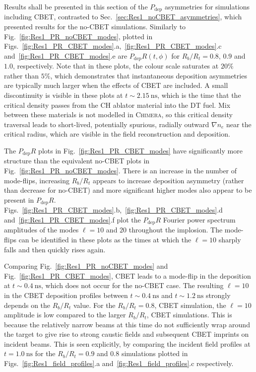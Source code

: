 Results shall be presented in this section of the $P_{\text{dep}}$ asymmetries for simulations including \ac{CBET}, contrasted to Sec.~\ref{sec:Res1_noCBET_asymmetries}, which presented results for the no-\ac{CBET} simulations.
Similarly to Fig.~\ref{fig:Res1_PR_noCBET_modes}, plotted in Figs.~\ref{fig:Res1_PR_CBET_modes}.a,~\ref{fig:Res1_PR_CBET_modes}.c and~\ref{fig:Res1_PR_CBET_modes}.e are $P_{\text{dep}}R(t,\phi)$ for $R_b/R_t=0.8$, $0.9$ and $1.0$, respectively.
Note that in these plots, the colour scale saturates at $20\%$ rather than $5\%$, which demonstrates that instantaneous deposition asymmetries are typically much larger when the effects of \ac{CBET} are included.
A small discontinuity is visible in these plots at $t\sim2.15\ \text{ns}$, which is the time that the critical density passes from the CH ablator material into the DT fuel.
Mix between these materials is not modelled in \textsc{Chimera}, so this critical density traversal leads to short-lived, potentially spurious, radially outward $\nabla n_e$ near the critical radius, which are visible in the field reconstruction and deposition.

The $P_{\text{dep}}R$ plots in Fig.~\ref{fig:Res1_PR_CBET_modes} have significantly more structure than the equivalent no-\ac{CBET} plots in Fig.~\ref{fig:Res1_PR_noCBET_modes}.
There is an increase in the number of mode-flips, increasing $R_b/R_t$ appears to increase deposition asymmetry (rather than decrease for no-\ac{CBET}) and more significant higher modes also appear to be present in $P_{\text{dep}}R$.
Figs.~\ref{fig:Res1_PR_CBET_modes}.b,~\ref{fig:Res1_PR_CBET_modes}.d and~\ref{fig:Res1_PR_CBET_modes}.f plot the $P_{\text{dep}}R$ Fourier power spectrum amplitudes of the modes $\ell=10$ and $20$ throughout the implosion.
The mode-flips can be identified in these plots as the times at which the $\ell=10$ sharply falls and then quickly rises again.

Comparing Fig.~\ref{fig:Res1_PR_noCBET_modes} and Fig.~\ref{fig:Res1_PR_CBET_modes}, \ac{CBET} leads to a mode-flip in the deposition at $t\sim0.4\ \text{ns}$, which does not occur for the no-\ac{CBET} case.
The resulting $\ell=10$ in the \ac{CBET} deposition profiles between $t\sim0.4\ \text{ns}$ and $t\sim1.2\ \text{ns}$ strongly depends on the $R_b/R_t$ value.
For the $R_b/R_t=0.8$, \ac{CBET} simulation, the $\ell=10$ amplitude is low compared to the larger $R_b/R_t$, \ac{CBET} simulations.
This is because the relatively narrow beams at this time do not sufficiently wrap around the target to give rise to strong caustic fields and subsequent \ac{CBET} imprints on incident beams.
This is seen explicitly, by comparing the incident field profiles at $t=1.0\ \text{ns}$ for the $R_b/R_t=0.9$ and $0.8$ simulations plotted in Figs.~\ref{fig:Res1_field_profiles}.a and~\ref{fig:Res1_field_profiles}.c respectively.


